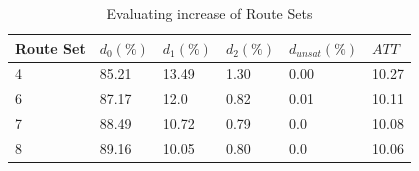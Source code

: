  \begin{table}[H]
    \centering
    \begin{tabular}{|l||l|l|l|l|l|}
    \hline
    Route Set & $d_0(\%)$ & $d_1(\%)$ & $d_2(\%)$ & $d_{unsat}(\%)$ & $ATT$ \\
    \hline
    4 & 85.21 & 13.49 & 1.30 & 0.00 & 10.27\\
    6 & 87.17 & 12.0 & 0.82 & 0.01 & 10.11\\
    7 & 88.49 & 10.72 & 0.79 & 0.0 & 10.08\\
    8 & 89.16 & 10.05 & 0.80 & 0.0 & 10.06\\
    \hline
    \end{tabular}
    \caption {Evaluating increase of Route Sets}
    \label{table:performanceComparison_routesets}
\end{table}








